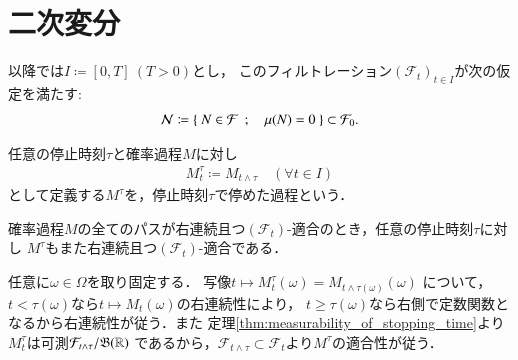 \section{二次変分}
	以降では$I \coloneqq [0,T]\ (T>0)$とし，
	このフィルトレーション$(\mathcal{F}_t)_{t \in I}$が次の仮定を満たす:
	\begin{align}
		\mathcal{N} \coloneqq \left\{\ N \in \mathcal{F}\ \, ; \quad \mu(N) = 0\ \right\}
		\subset \mathcal{F}_0.
	\end{align}
	
	\begin{screen}
		\begin{dfn}[停止時刻で停めた過程]
			任意の停止時刻$\tau$と確率過程$M$に対し
			\begin{align}
				M^\tau_t \coloneqq M_{t \wedge \tau}
				\quad (\forall t \in I)
			\end{align}
			として定義する$M^\tau$を，停止時刻$\tau$で停めた過程という．
			
		\end{dfn}
	\end{screen}
	
	\begin{screen}
		\begin{prp}[停めた過程の適合性]
			確率過程$M$の全てのパスが右連続且つ$(\mathcal{F}_t)$-適合のとき，任意の停止時刻$\tau$に対し
			$M^\tau$もまた右連続且つ$(\mathcal{F}_t)$-適合である．
		\end{prp}
	\end{screen}
	
	\begin{prf}
		任意に$\omega \in \Omega$を取り固定する．
		写像$t \longmapsto M_t^\tau(\omega) = M_{t \wedge \tau(\omega)}(\omega)$
		について，$t < \tau(\omega)$なら$t \longmapsto M_t(\omega)$の右連続性により，
		$t \geq \tau(\omega)$なら右側で定数関数となるから右連続性が従う．また
		定理\ref{thm:measurability_of_stopping_time}より
		$M_t^{\tau}$は可測$\mathcal{F}_{t \wedge \tau}/\mathfrak{B}(\mathbb{R})$
		であるから，$\mathcal{F}_{t\wedge \tau} \subset \mathcal{F}_t$より$M^\tau$の適合性が従う．
		\QED
	\end{prf}
	
